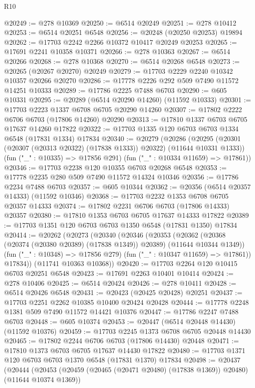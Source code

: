 \begin{lexlean}{R10}
\begin{coremodule}
@20249 := @278 @10369
@20250 := @6514 @20249
@20251 := @278 @10412
@20253 := @6514 @20251 @6548
@20256 := @20248 (@20250 @20253) @19894
@20262 := @17703 @2242 @2266 @10372 @10417 @20249 @20253
@20265 := @17691 @2241 @10358 @10371
@20266 := @278 @10363
@20267 := @6514 @20266
@20268 := @278 @10368
@20270 := @6514 @20268 @6548
@20273 := @20265 (@20267 @20270) @20249
@20279 := @17703 @2229 @2240 @10342 @10357 @20266 @20270
@20286 := @17778 @2226 @292 @509 @7490 @11572 @14251 @10333
@20289 := @17786 @2225 @7488 @6703
@20290 := @605 @10331
@20295 := @20289 (@6514 @20290 @14260) (@11592 @10333)
@20301 := @17703 @2223 @1337 @6708 @6705 @20290 @14260
@20307 := @17802 @2222 @6706 @6703 (@17806 @14260) @20290
@20313 := @17810 @1337 @6703 @6705 @17637 @14260 @17822
@20322 := @17703 @1335 @120 @6703 @6703 @1334 @6548 (@17831 @1334) @17834
@20340 := @20279
    (@20286
      (@20295 (@20301 (@20307 (@20313 @20322) (@17838 @1333)) @20322) (@11644 @10331 @1333))
      (fun ("_" : @10335) => @17856 @291)
      (fun ("_" : @10334 @11659) => @17861))
@20346 := @17703 @2238 @120 @10355 @6703 @20268 @6548
@20353 := @17778 @2235 @280 @509 @7490 @11572 @14324 @10346
@20356 := @17786 @2234 @7488 @6703
@20357 := @605 @10344
@20362 := @20356 (@6514 @20357 @14333) (@11592 @10346)
@20368 := @17703 @2232 @1353 @6708 @6705 @20357 @14333
@20374 := @17802 @2231 @6706 @6703 (@17806 @14333) @20357
@20380 := @17810 @1353 @6703 @6705 @17637 @14333 @17822
@20389 := @17703 @1351 @120 @6703 @6703 @1350 @6548 (@17831 @1350) @17834
@20414 := @20262
    (@20273
      (@20340
        (@20346
          (@20353
            (@20362 (@20368 (@20374 (@20380 @20389) (@17838 @1349)) @20389) (@11644 @10344 @1349))
            (fun ("_" : @10348) => @17856 @279)
            (fun ("_" : @10347 @11659) => @17861))
          @17834))
      (@11741 @10363 @10368))
@20420 := @17703 @2264 @120 @10415 @6703 @20251 @6548
@20423 := @17691 @2263 @10401 @10414
@20424 := @278 @10406
@20425 := @6514 @20424
@20426 := @278 @10411
@20428 := @6514 @20426 @6548
@20431 := @20423 (@20425 @20428) @20251
@20437 := @17703 @2251 @2262 @10385 @10400 @20424 @20428
@20444 := @17778 @2248 @1381 @509 @7490 @11572 @14421 @10376
@20447 := @17786 @2247 @7488 @6703
@20448 := @605 @10374
@20453 := @20447 (@6514 @20448 @14430) (@11592 @10376)
@20459 := @17703 @2245 @1373 @6708 @6705 @20448 @14430
@20465 := @17802 @2244 @6706 @6703 (@17806 @14430) @20448
@20471 := @17810 @1373 @6703 @6705 @17637 @14430 @17822
@20480 := @17703 @1371 @120 @6703 @6703 @1370 @6548 (@17831 @1370) @17834
@20498 := @20437
    (@20444
      (@20453 (@20459 (@20465 (@20471 @20480) (@17838 @1369)) @20480) (@11644 @10374 @1369))

\end{coremodule}
\end{lexlean}
